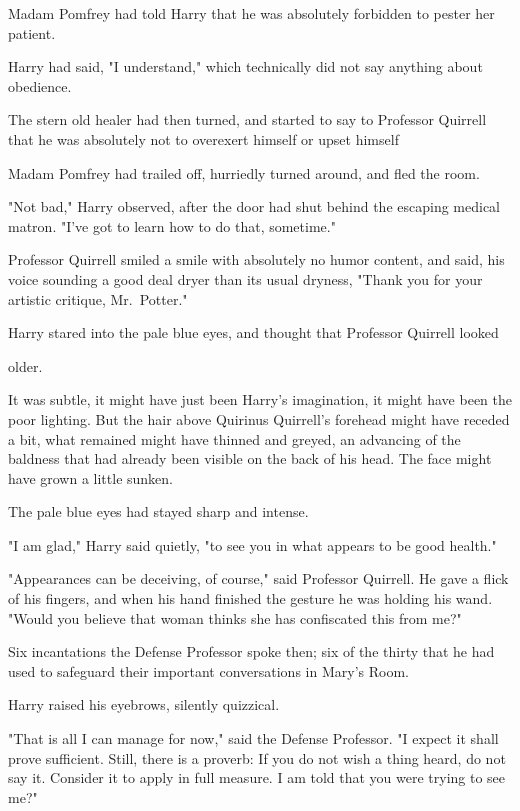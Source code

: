 Madam Pomfrey had told Harry that he was absolutely forbidden to pester her
patient.

Harry had said, "I understand," which technically did not say anything about
obedience.

The stern old healer had then turned, and started to say to Professor Quirrell
that he was absolutely not to overexert himself or{\el} upset himself{\el}

Madam Pomfrey had trailed off, hurriedly turned around, and fled the room.

"Not bad," Harry observed, after the door had shut behind the escaping medical
matron. "I've got to learn how to do that, sometime."

Professor Quirrell smiled a smile with absolutely no humor content, and said,
his voice sounding a good deal dryer than its usual dryness, "Thank you for
your artistic critique, Mr.~Potter."

Harry stared into the pale blue eyes, and thought that Professor Quirrell
looked{\el}

{\el} older.

It was subtle, it might have just been Harry's imagination, it might have been
the poor lighting. But the hair above Quirinus Quirrell's forehead might have
receded a bit, what remained might have thinned and greyed, an advancing of the
baldness that had already been visible on the back of his head. The face might
have grown a little sunken.

The pale blue eyes had stayed sharp and intense.

"I am glad," Harry said quietly, "to see you in what appears to be good health."

"Appearances can be deceiving, of course," said Professor Quirrell. He gave a
flick of his fingers, and when his hand finished the gesture he was holding his
wand. "Would you believe that woman thinks she has confiscated this from me?"

Six incantations the Defense Professor spoke then; six of the thirty that he
had used to safeguard their important conversations in Mary's Room.

Harry raised his eyebrows, silently quizzical.

"That is all I can manage for now," said the Defense Professor. "I expect it
shall prove sufficient. Still, there is a proverb: If you do not wish a thing
heard, do not say it. Consider it to apply in full measure. I am told that you
were trying to see me?"

